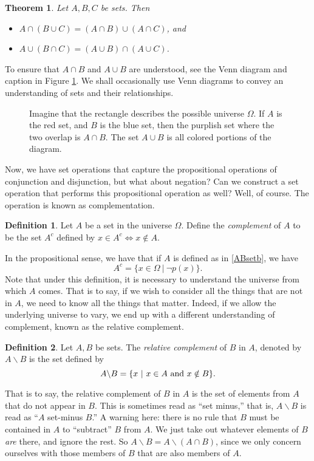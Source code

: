 \documentclass{article}
\newtheorem{theorem}{Theorem}
\theoremstyle{definition}
\newtheorem{definition}{Definition}
\renewcommand{\iff}{\Leftrightarrow}
\newcommand{\ba}{\backslash}
\begin{document}
\begin{theorem}
Let $A, B, C$ be sets. Then
\begin{itemize}
\item $A\cap(B\cup C)=(A\cap B)\cup(A\cap C)$, and
\item $A\cup(B\cap C)=(A\cup B)\cap (A\cup C)$.
\end{itemize}
\end{theorem}

To ensure that $A\cap B$ and $A\cup B$ are understood, see the Venn diagram and caption in Figure \ref{Vbasic}. We shall occasionally use Venn diagrams to convey an understanding of sets and their relationships.

\begin{figure}[htp]\centering
\caption{Imagine that the rectangle describes the possible universe $\Omega$. If $A$ is the red set, and $B$ is the blue set, then the purplish set where the two overlap is $A\cap B$. The set $A\cup B$ is all colored portions of the diagram.}\label{Vbasic}
 \end{figure}

Now, we have set operations that capture the propositional operations of conjunction and disjunction, but what about negation? Can we construct a set operation that performs this propositional operation as well? Well, of course. The operation is known as complementation.

\begin{definition}Let $A$ be a set in the universe $\Omega$. Define the {\it complement} of $A$ to be the set $A^c$ defined by $x\in A^c \iff x\notin A$. 
\end{definition}

In the propositional sense, we have that if $A$ is defined as in \eqref{ABsetb}, we have \[A^c = \{x\in \Omega\ | \ \neg p(x)\}.\]Note that under this definition, it is necessary to understand the universe from which $A$ comes. That is to say, if we wish to consider all the things that are not in $A$, we need to know all the things that matter. Indeed, if we allow the underlying universe to vary, we end up with a different understanding of complement, known as the relative complement.

\begin{definition} Let $A, B$ be sets. The {\it relative complement} of $B$ in $A$, denoted by $A\ba B$ is the set defined by \[A\ba B=\{x\ | \ x\in A \hbox{ and }x\notin B\}.\]
\end{definition}

That is to say, the relative complement of $B$ in $A$ is the set of elements from $A$ that do not appear in $B$. This is sometimes read as ``set minus,'' that is, $A\ba B$ is read as ``$A$ set-minus $B$.'' A warning here: there is no rule that $B$ must be contained in $A$ to ``subtract'' $B$ from $A$. We just take out whatever elements of $B$ {\it are} there, and ignore the rest. So $A\ba B = A\ba(A\cap B)$, since we only concern ourselves with those members of $B$ that are also members of $A$.
\end{document}
